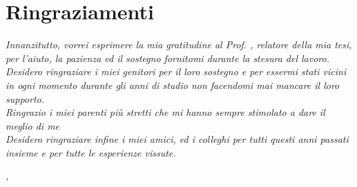 
\cleardoublepage
{}
{}



\bigskip

\begingroup
\let\clearpage\relax
\let\cleardoublepage\relax
\let\cleardoublepage\relax

\chapter*{Ringraziamenti}

\noindent \textit{Innanzitutto, vorrei esprimere la mia gratitudine al Prof. \myProf, relatore della mia tesi, per l'aiuto, la pazienza ed il sostegno fornitomi durante la stesura del lavoro.}\\

\noindent \textit{Desidero ringraziare i miei genitori per il loro sostegno e per essermi stati vicini in ogni momento durante gli anni di studio non facendomi mai mancare il loro supporto.}\\

\noindent \textit{Ringrazio i miei parenti più stretti che mi hanno sempre stimolato a dare il meglio di me}\\

\noindent \textit{Desidero ringraziare infine i miei amici, ed i colleghi per tutti questi anni passati insieme e per tutte le esperienze vissute.}\\
\bigskip

\noindent\textit{\myLocation, \myTime}
\hfill \myName

\endgroup

